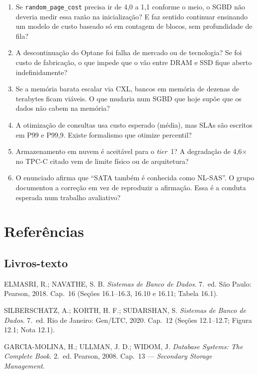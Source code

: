 \documentclass[11pt,a4paper]{article}
\begin{document}
\begin{enumerate}[label=\textbf{Q\arabic*.}]
\item Se \texttt{random\_page\_cost} precisa ir de 4,0 a 1,1 conforme o meio, o SGBD não
      deveria medir essa razão na inicialização? E faz sentido continuar ensinando um modelo de
      custo baseado só em contagem de blocos, sem profundidade de fila?
\item A descontinuação do Optane foi falha de mercado ou de tecnologia? Se foi custo de
      fabricação, o que impede que o vão entre DRAM e SSD fique aberto indefinidamente?
\item Se a memória barata escalar via CXL, bancos em memória de dezenas de terabytes ficam
      viáveis. O que mudaria num SGBD que hoje supõe que os dados não cabem na memória?
\item A otimização de consultas usa custo esperado (média), mas SLAs são escritos em P99 e
      P99,9. Existe formalismo que otimize percentil?
\item Armazenamento em nuvem é aceitável para o \emph{tier}~1? A degradação de 4,6$\times$ no
      TPC-C citado vem de limite físico ou de arquitetura?
\item O enunciado afirma que ``SATA também é conhecida como NL-SAS''. O grupo documentou a
      correção em vez de reproduzir a afirmação. Essa é a conduta esperada num trabalho
      avaliativo?
\end{enumerate}

\section{Referências}
\begingroup\small

\subsection*{Livros-texto}
\begin{enumerate}[label={[\arabic*]},leftmargin=*]
\item ELMASRI, R.; NAVATHE, S. B. \emph{Sistemas de Banco de Dados}. 7.\ ed. São Paulo:
      Pearson, 2018. Cap.~16 (Seções 16.1--16.3, 16.10 e 16.11; Tabela 16.1).
\item SILBERSCHATZ, A.; KORTH, H. F.; SUDARSHAN, S. \emph{Sistemas de Banco de Dados}.
      7.\ ed. Rio de Janeiro: Gen/LTC, 2020. Cap.~12 (Seções 12.1--12.7; Figura 12.1; Nota 12.1).
\item GARCIA-MOLINA, H.; ULLMAN, J. D.; WIDOM, J. \emph{Database Systems: The Complete
      Book}. 2.\ ed. Pearson, 2008. Cap.~13 --- \emph{Secondary Storage Management}.
\end{enumerate}
\end{document}
